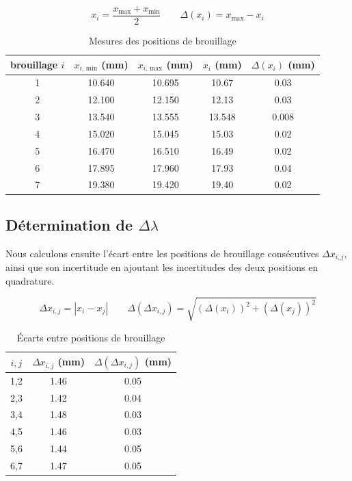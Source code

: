 \documentclass{article}
\begin{document}
\begin{equation}
    x_i = \frac{x_{\textrm{max}} + x_{\textrm{min}}}{2} \qquad \Delta(x_i) = x_{\textrm{max}} - x_i
\end{equation}

\begin{table}[H]
\begin{center}
    \begin{tabular}{|c|c|c|c|c|}
        \hline 
        brouillage $i$ & $x_{i\textrm{, min}}$ (mm) & $x_{i\textrm{, max}}$ (mm) & $x_{i}$ (mm) & $\Delta(x_i)$ (mm)\\
        \hline 
        1 & 10.640 & 10.695 & 10.67 & 0.03 \\
        \hline 
        2 & 12.100 & 12.150 & 12.13 & 0.03 \\
        \hline 
        3 & 13.540 & 13.555 & 13.548 & 0.008 \\
        \hline 
        4 & 15.020 & 15.045 & 15.03 & 0.02 \\
        \hline 
        5 & 16.470 & 16.510 & 16.49 & 0.02 \\
        \hline 
        6 & 17.895 & 17.960 & 17.93 & 0.04 \\
        \hline 
        7 & 19.380 & 19.420 & 19.40 & 0.02 \\
        \hline
    \end{tabular}
    \caption{Mesures des positions de brouillage}
\end{center}
\end{table}

\subsection{Détermination de $\Delta \lambda$}

Nous calculons ensuite l'écart entre les positions de brouillage consécutives $\Delta x_{i, j}$, ainsi que son incertitude en ajoutant les incertitudes 
des deux positions en quadrature.

\begin{equation}
    \Delta x_{i, j} = |x_i - x_j| \qquad \Delta(\Delta x_{i, j}) = \sqrt{(\Delta(x_i))^2 + (\Delta(x_j))^2}
\end{equation}

\begin{table}[H]
\begin{center}
    \begin{tabular}{|c|c|c|}
        \hline $i, j$ & $\Delta x_{i, j}$ (mm) & $\Delta(\Delta x_{i, j})$ (mm) \\
        \hline 1,2 & 1.46 & 0.05 \\
        \hline 2,3 & 1.42 & 0.04 \\
        \hline 3,4 & 1.48 & 0.03 \\
        \hline 4,5 & 1.46 & 0.03 \\
        \hline 5,6 & 1.44 & 0.05 \\
        \hline 6,7 & 1.47 & 0.05 \\
        \hline
    \end{tabular}
    \caption{Écarts entre positions de brouillage}
\end{center}
\end{table}
\end{document}
